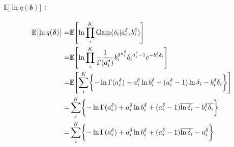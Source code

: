\paragraph{$\mathbb{E}\bigl[\ln q({\boldsymbol \delta}) \bigr]$ : }
\begin{align}
  \mathbb{E}\bigl[\ln q({\boldsymbol \delta}) \bigr]  
    =&  \mathbb{E}\Biggl[ \ln \prod_i^K  {\rm Gam}(\delta_i | a_i^\delta, b_i^\delta)  \Biggr]  \\
%
    =&  \mathbb{E}\Biggl[ \ln \prod_i^K  \frac{1}{ \Gamma(a_i^\delta) } {b_i^\delta}^{a_i^\delta} {\delta_i}^{a_i^\delta - 1} e^{-b_i^\delta \delta_i} \Biggr]  \\
%
  =&  \mathbb{E}\Biggl[ \sum_i^K \biggl\{  
      - \ln \Gamma(a_i^\delta) + a_i^\delta \ln b_i^\delta + (a_i^\delta - 1) \ln \delta_i - b_i^\delta \delta_i  %
    \biggr\} \Biggr]  \\
%
  =&  \sum_i^K \biggl\{  
      - \ln \Gamma(a_i^\delta) + a_i^\delta \ln b_i^\delta + (a_i^\delta - 1) \overline{\ln \delta_i} - b_i^\delta \overline{\delta_i}  
    \biggr\}  \\
%
  =&  \sum_i^K \biggl\{  
      - \ln \Gamma(a_i^\delta) + a_i^\delta \ln b_i^\delta + (a_i^\delta - 1) \overline{\ln \delta_i} - a_i^\delta  
    \biggr\}  
\end{align}

%
